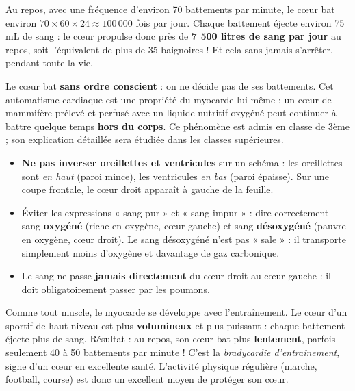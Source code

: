 \documentclass[11pt]{article}
\newcommand{\cle}[1]{{\popxbold\color{popdark}#1}}
\begin{document}
\begin{exemplebox}
Au repos, avec une fréquence d'environ 70 battements par minute, le cœur bat environ $70 \times 60 \times 24 \approx 100\,000$ fois par jour. Chaque battement éjecte environ 75 mL de sang : le cœur propulse donc près de \textbf{7 500 litres de sang par jour} au repos, soit l'équivalent de plus de 35 baignoires ! Et cela sans jamais s'arrêter, pendant toute la vie.
\end{exemplebox}

\begin{aretenir}
Le cœur bat \textbf{sans ordre conscient} : on ne décide pas de ses battements. Cet \cle{automatisme cardiaque} est une propriété du myocarde lui-même : un cœur de mammifère prélevé et perfusé avec un liquide nutritif oxygéné peut continuer à battre quelque temps \textbf{hors du corps}. Ce phénomène est admis en classe de 3ème ; son explication détaillée sera étudiée dans les classes supérieures.
\end{aretenir}

\begin{attention}
\begin{itemize}
\item \textbf{Ne pas inverser oreillettes et ventricules} sur un schéma : les oreillettes sont \emph{en haut} (paroi mince), les ventricules \emph{en bas} (paroi épaisse). Sur une coupe frontale, le cœur droit apparaît à gauche de la feuille.
\item Éviter les expressions « sang pur » et « sang impur » : dire correctement sang \textbf{oxygéné} (riche en oxygène, cœur gauche) et sang \textbf{désoxygéné} (pauvre en oxygène, cœur droit). Le sang désoxygéné n'est pas « sale » : il transporte simplement moins d'oxygène et davantage de gaz carbonique.
\item Le sang ne passe \textbf{jamais directement} du cœur droit au cœur gauche : il doit obligatoirement passer par les poumons.
\end{itemize}
\end{attention}

\begin{savaistu}
Comme tout muscle, le myocarde se développe avec l'entraînement. Le cœur d'un sportif de haut niveau est plus \textbf{volumineux} et plus puissant : chaque battement éjecte plus de sang. Résultat : au repos, son cœur bat plus \textbf{lentement}, parfois seulement 40 à 50 battements par minute ! C'est la \emph{bradycardie d'entraînement}, signe d'un cœur en excellente santé. L'activité physique régulière (marche, football, course) est donc un excellent moyen de protéger son cœur.
\end{savaistu}
\end{document}
